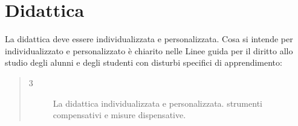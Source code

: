 \section{Didattica}
\label{sub:Didattic}
 La didattica deve essere individualizzata e personalizzata. 
Cosa si intende per individualizzato e personalizzato è chiarito nelle Linee guida per il diritto allo studio degli alunni e degli studenti con disturbi specifici di apprendimento:
\begin{quote}
\begin{description}
	\item[3] La didattica individualizzata e personalizzata.
	strumenti compensativi e misure dispensative.
	

\end{description}
\end{quote}
